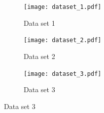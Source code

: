 \documentclass[12pt]{article} %
\begin{document}
\begin{figure}[h]
	\centering
	\begin{subfigure}[b]{0.3\textwidth}
		\caption{Data set 1}
		\texttt{[image: dataset\_1.pdf]}
	\end{subfigure}
	\begin{subfigure}[b]{0.3\textwidth}
		\caption{Data set 2}
		\texttt{[image: dataset\_2.pdf]}
	\end{subfigure}
	\begin{subfigure}[b]{0.3\textwidth}
		\caption{Data set 3}
		\texttt{[image: dataset\_3.pdf]}
	\end{subfigure}
\end{figure}

\newpage


\end{document}
